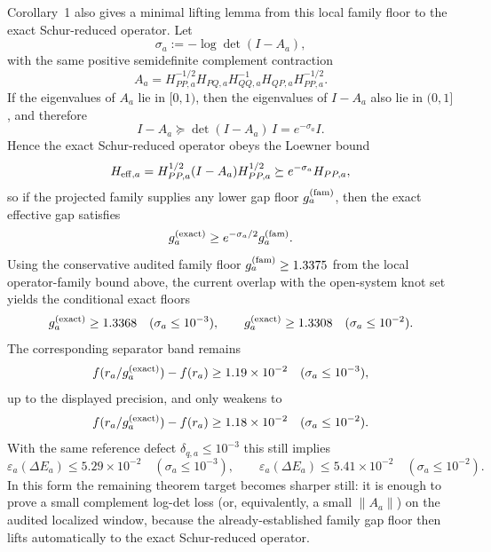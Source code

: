 \documentclass[aps,prd,onecolumn,notitlepage,nofootinbib,superscriptaddress,11pt,floatfix]{revtex4-2}
\begin{document}
Corollary~1 also gives a minimal lifting lemma from this local family floor to the exact Schur-reduced operator. Let
\[
\sigma_a:=-\log\det(I-A_a),
\]
with the same positive semidefinite complement contraction
\[
A_a=H_{PP,a}^{-1/2}H_{PQ,a}H_{QQ,a}^{-1}H_{QP,a}H_{PP,a}^{-1/2}.
\]
If the eigenvalues of $A_a$ lie in $[0,1)$, then the eigenvalues of $I-A_a$ also lie in $(0,1]$, and therefore
\[
I-A_a\succeq \det(I-A_a)\,I=e^{-\sigma_a}I.
\]
Hence the exact Schur-reduced operator obeys the Loewner bound
\[
H_{{\rm eff},a}
=
H_{PP,a}^{1/2}(I-A_a)H_{PP,a}^{1/2}
\succeq
e^{-\sigma_a}H_{PP,a},
\]
so if the projected family supplies any lower gap floor $g^{\rm(fam)}_a$, then the exact effective gap satisfies
\[
g^{\rm(exact)}_a\ge e^{-\sigma_a/2} g^{\rm(fam)}_a.
\]
Using the conservative audited family floor $g^{\rm(fam)}_a\ge 1.3375$ from the local operator-family bound above, the current overlap with the open-system knot set yields the conditional exact floors
\[
g^{\rm(exact)}_a\ge 1.3368\quad(\sigma_a\le 10^{-3}),
\qquad
g^{\rm(exact)}_a\ge 1.3308\quad(\sigma_a\le 10^{-2}).
\]
The corresponding separator band remains
\[
f(r_a/g^{\rm(exact)}_a)-f(r_a)\ge 1.19\times10^{-2}\quad(\sigma_a\le 10^{-3}),
\]
up to the displayed precision, and only weakens to
\[
f(r_a/g^{\rm(exact)}_a)-f(r_a)\ge 1.18\times10^{-2}\quad(\sigma_a\le 10^{-2}).
\]
With the same reference defect $\delta_{q,a}\le 10^{-3}$ this still implies
\[
\varepsilon_a(\Delta E_a)\le 5.29\times10^{-2}\quad(\sigma_a\le 10^{-3}),
\qquad
\varepsilon_a(\Delta E_a)\le 5.41\times10^{-2}\quad(\sigma_a\le 10^{-2}).
\]
In this form the remaining theorem target becomes sharper still: it is enough to prove a small complement log-det loss (or, equivalently, a small $\|A_a\|$) on the audited localized window, because the already-established family gap floor then lifts automatically to the exact Schur-reduced operator.
\end{document}
